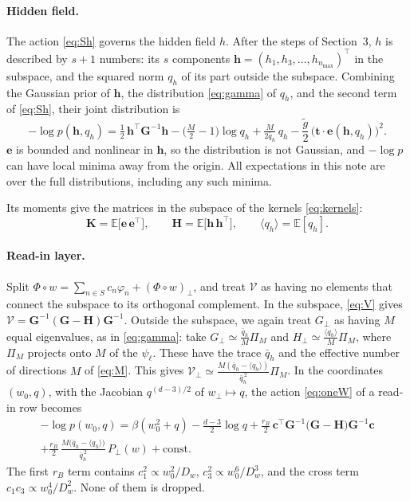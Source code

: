 \documentclass[11pt,a4paper]{article}
\newcommand{\E}{\mathbb{E}}
\begin{document}
\paragraph{Hidden field.}
The action \eqref{eq:Sh} governs the hidden field $h$.
After the steps of Section~3, $h$ is described by $s+1$ numbers: its $s$ components $\mathbf h=(h_1,h_3,\dots,h_{n_{\max}})^\top$
in the subspace, and the squared norm $q_h$ of its part outside the subspace.
Combining the Gaussian prior of $\mathbf h$, the distribution \eqref{eq:gamma} of $q_h$, and the second term of \eqref{eq:Sh},
their joint distribution is
\begin{equation}
  -\log p(\mathbf h,q_h)=\tfrac12\,\mathbf h^\top \mathbf G^{-1}\mathbf h
  -\big(\tfrac M2-1\big)\log q_h+\tfrac{M}{2\bar q_h}\,q_h
  -\frac{\tilde g}{2}\,\big(\mathbf t\cdot\mathbf e(\mathbf h,q_h)\big)^2 .
  \label{eq:middle}
\end{equation}
$\mathbf e$ is bounded and nonlinear in $\mathbf h$, so the distribution is not Gaussian, and $-\log p$ can have local minima away from the origin.
All expectations in this note are over the full distributions, including any such minima.

Its moments give the matrices in the subspace of the kernels \eqref{eq:kernels}:
\begin{equation}
  \mathbf K=\E\big[\mathbf e\,\mathbf e^\top\big],\qquad
  \mathbf H=\E\big[\mathbf h\,\mathbf h^\top\big],\qquad
  \langle q_h\rangle=\E[q_h].
  \label{eq:moments}
\end{equation}

\paragraph{Read-in layer.}
Split $\Phi\circ w=\sum_{n\in S}c_n\varphi_n+(\Phi\circ w)_\perp$, and treat $\mathcal V$ as having no elements that connect the subspace to its
orthogonal complement.
In the subspace, \eqref{eq:V} gives $\boldsymbol{\mathcal V}=\mathbf G^{-1}(\mathbf G-\mathbf H)\mathbf G^{-1}$.
Outside the subspace, we again treat $G_\perp$ as having $M$ equal eigenvalues, as in \eqref{eq:gamma}: take $G_\perp\simeq\frac{\bar q_h}{M}\Pi_M$ and
$H_\perp\simeq\frac{\langle q_h\rangle}{M}\Pi_M$, where $\Pi_M$ projects onto $M$ of the $\psi_\ell$.
These have the trace $\bar q_h$ and the effective number of directions $M$ of \eqref{eq:M}.
This gives $\mathcal V_\perp\simeq\frac{M(\bar q_h-\langle q_h\rangle)}{\bar q_h^{\,2}}\Pi_M$.
In the coordinates $(w_0,q)$, with the Jacobian $q^{(d-3)/2}$ of $w_\perp\mapsto q$, the action \eqref{eq:oneW} of a read-in row becomes
\begin{multline}
  -\log p(w_0,q)=\beta(w_0^2+q)-\tfrac{d-3}{2}\log q
  +\frac{r_B}{2}\,\mathbf c^\top \mathbf G^{-1}\big(\mathbf G-\mathbf H\big)\mathbf G^{-1}\mathbf c\\
  +\frac{r_B}{2}\,\frac{M\big(\bar q_h-\langle q_h\rangle\big)}{\bar q_h^{\,2}}\,P_\perp(w)
  +\text{const}.
  \label{eq:readin}
\end{multline}
The first $r_B$ term contains $c_1^2\propto w_0^2/D_w$, $c_3^2\propto w_0^6/D_w^3$, and the cross term $c_1c_3\propto w_0^4/D_w^2$.
None of them is dropped.
\end{document}

